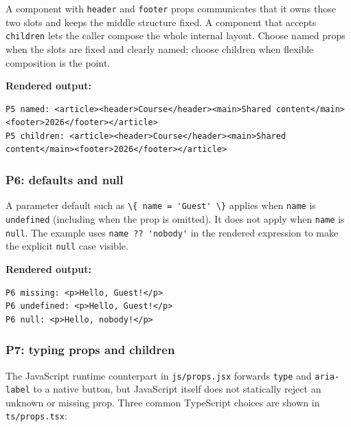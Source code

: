 \documentclass[
]{article}
\newcommand{\passthrough}[1]{#1}
\begin{document}
A component with \passthrough{\lstinline!header!} and
\passthrough{\lstinline!footer!} props communicates that it owns those
two slots and keeps the middle structure fixed. A component that accepts
\passthrough{\lstinline!children!} lets the caller compose the whole
internal layout. Choose named props when the slots are fixed and clearly
named; choose children when flexible composition is the point.

\textbf{Rendered output:}

\begin{lstlisting}
P5 named: <article><header>Course</header><main>Shared content</main><footer>2026</footer></article>
P5 children: <article><header>Course</header><main>Shared content</main><footer>2026</footer></article>
\end{lstlisting}

\subsubsection{P6: defaults and null}\label{p6-defaults-and-null}

A parameter default such as
\passthrough{\lstinline!\{ name = 'Guest' \}!} applies when
\passthrough{\lstinline!name!} is \passthrough{\lstinline!undefined!}
(including when the prop is omitted). It does not apply when
\passthrough{\lstinline!name!} is \passthrough{\lstinline!null!}. The
example uses \passthrough{\lstinline!name ?? 'nobody'!} in the rendered
expression to make the explicit \passthrough{\lstinline!null!} case
visible.

\textbf{Rendered output:}

\begin{lstlisting}
P6 missing: <p>Hello, Guest!</p>
P6 undefined: <p>Hello, Guest!</p>
P6 null: <p>Hello, nobody!</p>
\end{lstlisting}

\subsubsection{P7: typing props and
children}\label{p7-typing-props-and-children}

The JavaScript runtime counterpart in
\passthrough{\lstinline!js/props.jsx!} forwards
\passthrough{\lstinline!type!} and \passthrough{\lstinline!aria-label!}
to a native button, but JavaScript itself does not statically reject an
unknown or missing prop. Three common TypeScript choices are shown in
\passthrough{\lstinline!ts/props.tsx!}:
\end{document}
